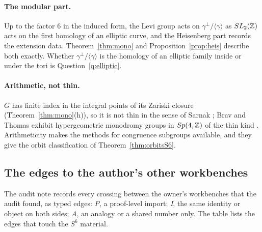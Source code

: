 \paragraph{The modular part.} Up to the factor $6$ in the induced form, the Levi group acts on $\gamma^\perp/\langle\gamma\rangle$ as $SL_2(\mathbb{Z})$ acts on the first homology of an elliptic curve, and the Heisenberg part records the extension data. Theorem~\ref{thm:mono} and Proposition~\ref{prop:heis} describe both exactly. Whether $\gamma^\perp/\langle\gamma\rangle$ is the homology of an elliptic family inside or under the tori is Question~\ref{q:elliptic}.

\paragraph{Arithmetic, not thin.} $G$ has finite index in the integral points of its Zariski closure (Theorem~\ref{thm:mono}(h)), so it is not thin in the sense of Sarnak \cite{SarnakThin}; Brav and Thomas exhibit hypergeometric monodromy groups in $Sp(4,\mathbb{Z})$ of the thin kind \cite{BravThomas}. Arithmeticity makes the methods for congruence subgroups available, and they give the orbit classification of Theorem~\ref{thm:orbitsS6}.

\subsection{The edges to the author's other workbenches}

The audit note  records every crossing between the owner's workbenches that the audit found, as typed edges: \emph{P}, a proof-level import; \emph{I}, the same identity or object on both sides; \emph{A}, an analogy or a shared number only. The table lists the edges that touch the $S^6$ material.

